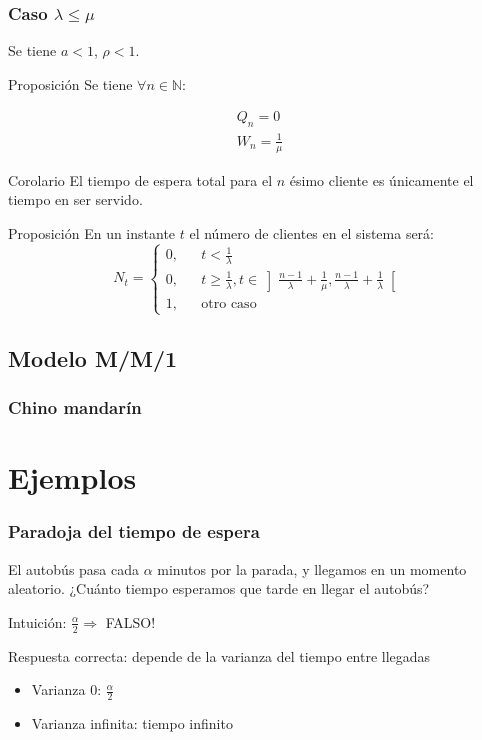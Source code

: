 \documentclass[8pt]{beamer}
\begin{document}
  \begin{frame}\frametitle{Caso $\lambda \le \mu$}
    Se tiene $a < 1$, $\rho < 1$.

    \begin{block}{Proposición}
Se tiene $\forall n\in \mathbb{N}$:

\begin{align*}
Q_n = 0\\
W_n = \frac{1}{\mu}
\end{align*}
    \end{block}

    \begin{block}{Corolario}
 El tiempo de espera total para el $n$ ésimo cliente es únicamente el tiempo en ser servido.
    \end{block}

    \begin{block}{Proposición}
 En un instante $t$ el número de clientes en el sistema será: 
 \[N_t = \left\{\begin{array}{lcc}
          0, && t < \frac{1}{\lambda}\\
          0, && t \ge \frac{1}{\lambda}, t \in \left]\frac{n-1}{\lambda} + \frac{1}{\mu}, \frac{n-1}{\lambda} + \frac{1}{\lambda}\right[\\
          1, && \text{otro caso}
         \end{array}\right.\]
    \end{block}
  \end{frame}

  \subsection{Modelo M/M/1}
  \begin{frame}\frametitle{Chino mandarín}
    
  \end{frame}

  \section{Ejemplos}
  \begin{frame}\frametitle{Paradoja del tiempo de espera}
    El autobús pasa cada $\alpha$ minutos por la parada, y llegamos en un momento aleatorio. ¿Cuánto tiempo esperamos que tarde en llegar el autobús?

    Intuición:  $\frac{\alpha}{2} \Rightarrow$  FALSO!

    Respuesta correcta: depende de la varianza del tiempo entre llegadas
    \begin{itemize}
    \item Varianza 0: $\frac{\alpha}{2}$
    \item Varianza infinita: tiempo infinito
    \end{itemize}
  \end{frame}
\end{document}
